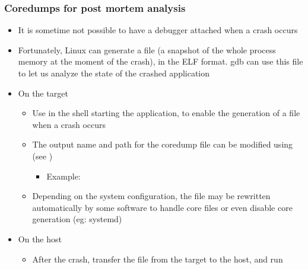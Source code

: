 \begin{frame}[fragile]
  \frametitle{Coredumps for post mortem analysis}
  \begin{itemize}
  \item It is sometime not possible to have a debugger attached when a
	  crash occurs
  \item Fortunately, Linux can generate a  file (a snapshot of
    the whole process memory at the moment of the crash), in the ELF
      format. gdb can use this  file to let us analyze the state
      of the crashed application
  \item On the target
    \begin{itemize}
    \item Use  in the shell starting the
      application, to enable the generation of a  file
      when a crash occurs
    \item The output name and path for the coredump file can be modified using
	     (see )
		    \begin{itemize}
			    \item Example: 
		    \end{itemize}
    \item Depending on the system configuration, the 
      file may be rewritten automatically by some software to handle core
        files or even disable core generation (eg: systemd)
    \end{itemize}
  \item On the host
    \begin{itemize}
    \item After the crash, transfer the  file from the target to
      the host, and run
    \end{itemize}
  \end{itemize}
\end{frame}

